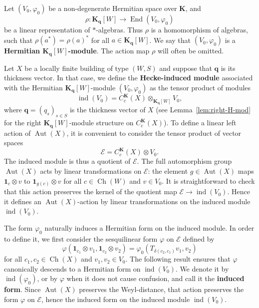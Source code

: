 \documentclass[12pt,a4paper]{amsproc}
\theoremstyle{definition}
\DeclareMathOperator{\Aut}{Aut}
\DeclareMathOperator{\End}{End}
\DeclareMathOperator{\Ind}{ind}
\DeclareMathOperator{\Ch}{Ch}
\newcommand{\KK}{\mathbf K}
\newcommand{\one}{\mathbf 1}
\newcommand{\qq}{\mathbf q}
\begin{document}
Let   $(V_0, \varphi_0)$ be a non-degenerate Hermitian space over $\KK$,  and 
$$\rho \colon \KK_{\mathbf q}[W]\to \End(V_0, \varphi_0)$$ 
be a linear representation of $*$-algebras. Thus $\rho$ is a homomorphism of algebras, such that $\rho(a^*) = \rho(a)^*$ for all $a \in  \KK_{\mathbf q}[W]$. We say that $(V_0, \varphi_0)$ is a \textbf{Hermitian $\KK_{\mathbf q}[W]$-module}.  The action map $\rho$ will often be omitted. 

 
 Let $X$ be a   locally finite building of type $(W, S)$ and suppose that $\qq$ is its thickness vector. In that case, we define the \textbf{Hecke-induced module} associated with the Hermitian $\KK_\qq[W]$-module $(V_0, \varphi_0)$ as the tensor product of modules
$$\Ind(V_0) = C^\KK_c(X) \otimes_{\KK_\qq[W]} V_0,$$
where $\qq=(q_s)_{s \in S}$ is the thickness vector of $X$ (see Lemma~\ref{lem:right-H-mod} for the right $\KK_\qq[W]$-module structure on $C^\KK_c(X)$). To define a linear left action of $\Aut(X)$, it is convenient to consider the tensor product of vector spaces 
$$\mathscr E = C^\KK_c(X) \otimes V_0.$$
The induced module is thus a quotient of $\mathscr E$. The full automorphism group $\Aut(X)$ acts by linear transformations on $\mathscr E$: the element $g \in \Aut(X)$ maps $\one_c \otimes v$ to $\one_{g(c)} \otimes v$ for all $c \in \Ch(W)$ and $v \in V_0$. It is straightforward to check that this action preserves the kernel of the quotient map $\mathscr E \to \Ind(V_0)$. Hence it defines an $\Aut(X)$-action by linear transformations on the induced module $\Ind(V_0)$. 

The   form $\varphi_0$ naturally induces a Hermitian form on the induced module. In order to define it, we first consider the sesquilinear form $\varphi$  on $\mathscr E$ defined by 
$$\varphi(\one_{c_1} \otimes v_1, \one_{c_2} \otimes v_2) = \varphi_0(T_{\delta(c_2, c_1)}v_1, v_2)$$
for all $c_1, c_2 \in \Ch(X)$ and $v_1, v_2 \in V_0$. 
The following result ensures that $\varphi$ canonically descends to a Hermitian form on $\Ind(V_0)$. We denote it by $\Ind(\varphi_0)$, or by $\varphi$ when it does not cause confusion, and call it  the \textbf{induced form}.
Since $\Aut(X)$ preserves the Weyl-distance, that action preserves the form $\varphi$ on $\mathscr E$, hence the induced form on the induced module $\Ind(V_0)$.
\end{document}
